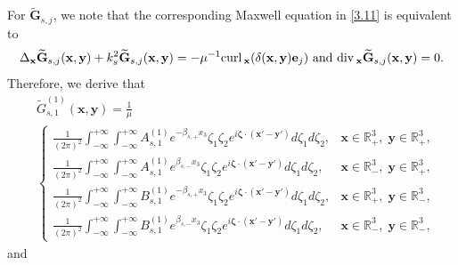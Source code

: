 \documentclass[final,reqno]{siamltex}
\newcommand{\curl}{{\rm curl\,}}
\newcommand{\dive}{{\rm div\,}}
\newcommand{\wid}{\widetilde}
\newcommand{\mat}{\mathbb}
\newcommand{\R}{{\mat R}}
\begin{document}
For $\mathbf{\wid G}_{s,j}$, we note that the corresponding Maxwell equation in \eqref{3.11} is equivalent to 
$$
  \Delta_{\mathbf{x}}\mathbf{\wid G}_{s,j}(\mathbf{x},\mathbf{y})+k_s^2\mathbf{\wid G}_{s,j}(\mathbf{x},\mathbf{y})=-\mu^{-1}\curl_{\mathbf{x}}(\delta(\mathbf{x},\mathbf{y})\mathbf{e}_j)
  ~\text{and}~\dive_{\mathbf{x}}\mathbf{\wid G}_{s,j}(\mathbf{x},\mathbf{y})=0. 
$$
Therefore, we derive that 
\begin{align*}
&\wid G_{s,1}^{(1)}(\mathbf{x},\mathbf{y})=\frac{1}{\mu} \\
&\left\{
\begin{array}{ll}
	\displaystyle\frac{1}{(2\pi)^2}\int_{-\infty}^{+\infty}\int_{-\infty}^{+\infty}A_{s,1}^{(1)}e^{-\beta_{s,+}x_3}\zeta_1\zeta_2e^{i\boldsymbol{\zeta}\cdot(\mathbf{x}'-\mathbf{y}')}d\zeta_1d\zeta_2,&\mathbf{x}\in\R^3_+,\;\mathbf{y}\in\R^3_+,\\
	\displaystyle\frac{1}{(2\pi)^2}\int_{-\infty}^{+\infty}\int_{-\infty}^{+\infty}A_{s,1}^{(1)}e^{\beta_{s,-}x_3}\zeta_1\zeta_2e^{i\boldsymbol{\zeta}\cdot(\mathbf{x}'-\mathbf{y}')}d\zeta_1d\zeta_2,&\mathbf{x}\in\R^3_-,\;\mathbf{y}\in\R^3_+, \\
	\displaystyle\frac{1}{(2\pi)^2}\int_{-\infty}^{+\infty}\int_{-\infty}^{+\infty}B_{s,1}^{(1)}e^{-\beta_{s,+}x_3}\zeta_1\zeta_2e^{i\boldsymbol{\zeta}\cdot(\mathbf{x}'-\mathbf{y}')}d\zeta_1d\zeta_2,&\mathbf{x}\in\R^3_+,\;\mathbf{y}\in\R^3_-, \\
	\displaystyle\frac{1}{(2\pi)^2}\int_{-\infty}^{+\infty}\int_{-\infty}^{+\infty}B_{s,1}^{(1)}e^{\beta_{s,-}x_3}\zeta_1\zeta_2e^{i\boldsymbol{\zeta}\cdot(\mathbf{x}'-\mathbf{y}')}d\zeta_1d\zeta_2,&\mathbf{x}\in\R^3_-,\;\mathbf{y}\in\R^3_-, 
\end{array}
\right.
\end{align*}
and 
\end{document}
